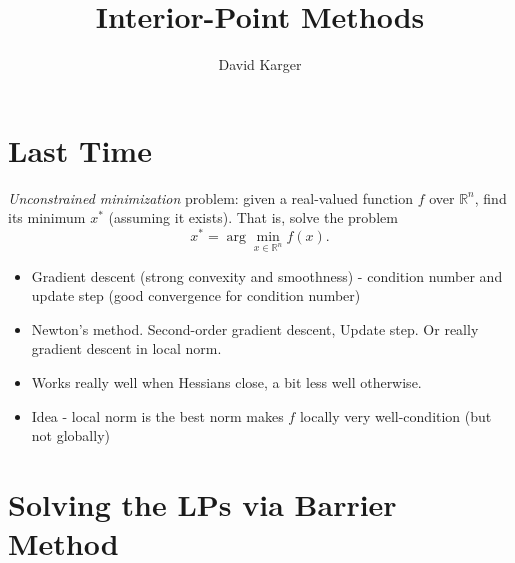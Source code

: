 \documentclass{article}
\title{Interior-Point Methods}
\author{David Karger}
\newcommand{\RR}{\mathbb{R}}
\begin{document}
\section{Last Time}
{\em Unconstrained minimization} problem: given a real-valued function $f$ over $\RR^n$, find its minimum $x^*$ (assuming it exists). That is, solve the problem
\[
x^*=\arg\min_{x\in \RR^n} f(x).
\]
\begin{itemize}
\item Gradient descent (strong convexity and smoothness) - condition number and update step (good convergence for condition number)
\item Newton's method. Second-order gradient descent, Update step. Or really gradient descent in local norm. 
\item Works really well when Hessians close, a bit less well otherwise. 
\item Idea - local norm is the best norm makes $f$ locally very well-condition (but not globally) 
\end{itemize}

\section{Solving the LPs via Barrier Method}
\end{document}

